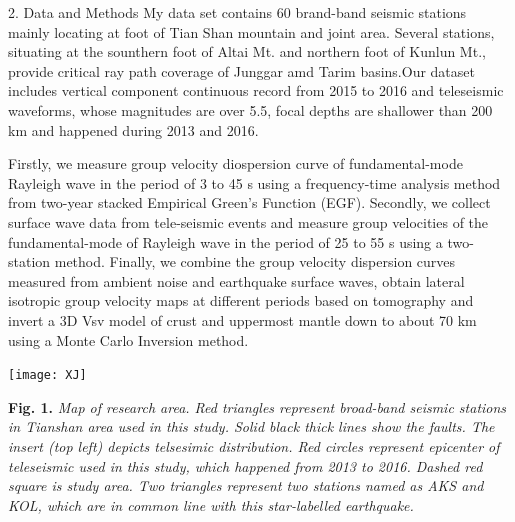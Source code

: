 \documentclass[
    landscape,      %
    paperwidth = 1200mm,
    paperheight = 900mm,
    fontscale = 0.34,
    margin = 1.7cm,
]{baposter}
\begin{document}
\begin{poster}
\begin{posterbox}[column=0, below=auto]{2. Data and Methods}
\setlength{\parskip}{3pt}
My data set contains 60 brand-band seismic stations mainly
locating at foot of Tian Shan mountain and joint area.
Several stations, situating at the sounthern foot of Altai Mt. and northern foot of Kunlun Mt.,
provide critical ray path coverage of Junggar amd Tarim basins.Our dataset includes vertical
component continuous record from 2015 to 2016 and teleseismic waveforms,
whose magnitudes are over 5.5, focal depths are shallower than 200 km and happened during
2013 and 2016.

 Firstly, we measure group velocity diospersion curve of fundamental-mode Rayleigh wave in the period of 3 to 45 s using
 a frequency-time analysis method from two-year stacked Empirical Green's Function (EGF).
 Secondly, we collect surface wave data from tele-seismic events and measure group velocities of the fundamental-mode
 of Rayleigh wave in the period of 25 to 55 s using a two-station method.
 Finally, we combine the group velocity dispersion curves measured from ambient noise and earthquake surface waves,
 obtain lateral isotropic group velocity maps at different periods based on tomography and invert a 3D Vsv model of crust
 and uppermost mantle down to about 70 km using a Monte Carlo Inversion method.


\begin{center}
  \texttt{[image: XJ]}
\end{center}

\begin{center}


\begin{minipage}{0.9\textwidth}
\small
\textbf{Fig. 1.}
\itshape
Map of research area. Red triangles represent broad-band seismic stations
in Tianshan area used in this study. Solid black thick lines show the faults.
The insert (top left) depicts telsesimic distribution. Red circles represent
epicenter of teleseismic used in this study, which happened from 2013 to 2016.
Dashed red square is study area. Two triangles represent two stations named as
AKS and KOL, which are in common line with this star-labelled earthquake.
\end{minipage}
\end{center}


\end{posterbox}
\end{poster}
\end{document}
